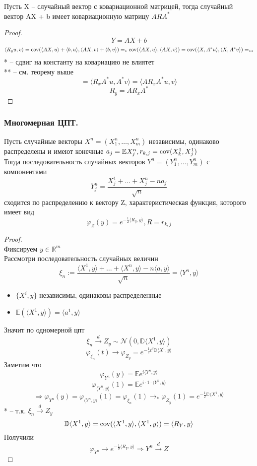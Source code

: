     \begin{theorem}
        Пусть X -- случайный вектор с ковариационной матрицей, тогда случайный вектор AX + b имеет ковариационную матрицу $ ARA^* $
    \end{theorem}
    \begin{proof}
        $$ Y = AX + b $$
        $$ \langle R_yu, v\rangle = \operatorname{cov}(\langle AX, u \rangle + \langle b, u \rangle, \langle AX, v \rangle + \langle b, v \rangle) =_{*} \operatorname{cov}(\langle AX, u \rangle, \langle AX, v \rangle) = \operatorname{cov}(\langle X, A^*u \rangle, \langle X, A^{*}v \rangle) =_{**}$$
        * -- сдвиг на константу на ковариацию не влиятет\\
        ** -- см. теорему выше
        $$ = \langle R_xA^*u,A^*v\rangle =  \langle AR_xA^*u,v\rangle$$
        $$R_y = AR_xA^*$$
    \end{proof}
    \subsubsection{Многомерная ЦПТ.}
    \begin{theorem}
        Пусть случайные векторы $ X^n = (X^n_1,\ldots, X^n_m) $ независимы, одинаково распределены и имеют конечные $ a_j = \mathbb{E}X^n_j, r_{k,j} = \operatorname{cov}(X^1_k, X^1_j) $\\
        Тогда последовательность случайных векторов $Y^n = (Y^n_1,\ldots, Y^n_m) $ с компонентами
        $$Y_j^n = \frac{X^1_j + \ldots + X^n_j - na_j}{\sqrt{n}}$$
        сходится по распределению к вектору Z, характеристическая функция, которого имеет вид
        $$\varphi_{Z}(y) = e^{-\frac{1}{2}\langle R_y,y\rangle}, R = r_{k,j}$$
    \end{theorem}
    \begin{proof}
        \text{ }\\
        Фиксируем $ y\in\mathbb{R}^m $\\
        Рассмотри последовательность случайных величин
        $$\xi_n:=\frac{\langle X^1, y\rangle + \ldots + \langle X^n, y\rangle - n\langle a, y\rangle}{\sqrt{n}} = \langle Y^n, y \rangle$$
        \begin{itemize}
            \item $\{X^i, y\}$ независимы, одинаковы распределенные
            \item $\mathbb{E}(\langle X^1, y\rangle) = \langle a^1, y\rangle$
        \end{itemize}
    Значит по одномерной цпт
    $$\xi_n\xrightarrow{d}Z_y\sim \mathcal{N}(0,\mathbb{D}\langle X^1, y\rangle)$$
    $$\varphi_{\xi_n}(t)\to\varphi_{Z_y} = e^{-\frac{1}{2}t^2\mathbb{D}\langle X^1, y\rangle}$$
    Заметим что
    $$\varphi_{Y^n}(y) = \mathbb{E}e^{i\langle Y^n, y\rangle}$$
    $$\varphi_{\langle Y^n, y\rangle}(1) = \mathbb{E}e^{i\cdot1\cdot\langle Y^n, y\rangle}$$
    $$\Rightarrow \varphi_{Y^n}(y) = \varphi_{\langle Y^n, y\rangle}(1) = \varphi_{\xi_n}(1) \to_{*} \varphi_{Z_y}(1) = e^{-\frac{1}{2}\mathbb{D}\langle X^1, y\rangle}$$
    * -- т.к. $ \xi_n\xrightarrow{d} Z_y $
    $$\mathbb{D}\langle X^1, y\rangle = \operatorname{cov}(\langle X^1, y\rangle , \langle X^1, y\rangle ) = \langle R_Y, y\rangle $$
    Получили
    $$\varphi_{Y^n}\to e^{-\frac{1}{2}\langle R_Y, y\rangle } \Rightarrow Y^n\xrightarrow{d}Z$$
    \end{proof}
